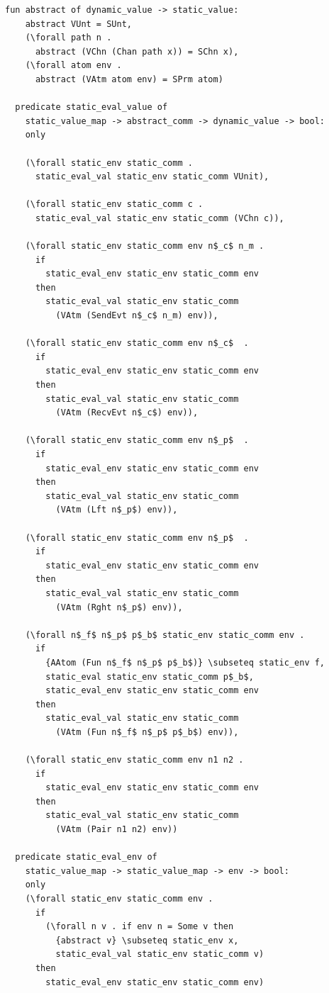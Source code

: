 \documentclass[10pt]{article}
\begin{document}
\begin{lstlisting}[language=logic, mathescape]
  fun abstract of dynamic_value -> static_value:
    abstract VUnt = SUnt, 
    (\forall path n . 
      abstract (VChn (Chan path x)) = SChn x),
    (\forall atom env .
      abstract (VAtm atom env) = SPrm atom)

  predicate static_eval_value of
    static_value_map -> abstract_comm -> dynamic_value -> bool: 
    only

    (\forall static_env static_comm .
      static_eval_val static_env static_comm VUnit),

    (\forall static_env static_comm c .
      static_eval_val static_env static_comm (VChn c)),

    (\forall static_env static_comm env n$_c$ n_m .
      if
        static_eval_env static_env static_comm env
      then
        static_eval_val static_env static_comm
          (VAtm (SendEvt n$_c$ n_m) env)),

    (\forall static_env static_comm env n$_c$  .
      if
        static_eval_env static_env static_comm env
      then
        static_eval_val static_env static_comm
          (VAtm (RecvEvt n$_c$) env)),

    (\forall static_env static_comm env n$_p$  .
      if
        static_eval_env static_env static_comm env
      then
        static_eval_val static_env static_comm
          (VAtm (Lft n$_p$) env)),
        
    (\forall static_env static_comm env n$_p$  .
      if
        static_eval_env static_env static_comm env
      then
        static_eval_val static_env static_comm
          (VAtm (Rght n$_p$) env)),

    (\forall n$_f$ n$_p$ p$_b$ static_env static_comm env .
      if
        {AAtom (Fun n$_f$ n$_p$ p$_b$)} \subseteq static_env f, 
        static_eval static_env static_comm p$_b$, 
        static_eval_env static_env static_comm env
      then
        static_eval_val static_env static_comm
          (VAtm (Fun n$_f$ n$_p$ p$_b$) env)),

    (\forall static_env static_comm env n1 n2 .
      if
        static_eval_env static_env static_comm env
      then
        static_eval_val static_env static_comm
          (VAtm (Pair n1 n2) env))

  predicate static_eval_env of
    static_value_map -> static_value_map -> env -> bool:
    only 
    (\forall static_env static_comm env .
      if
        (\forall n v . if env n = Some v then
          {abstract v} \subseteq static_env x,
          static_eval_val static_env static_comm v)
      then 
        static_eval_env static_env static_comm env)


\end{lstlisting}
\end{document}
